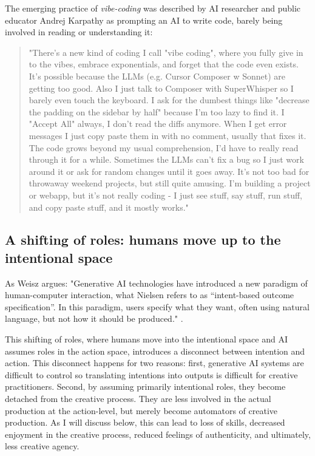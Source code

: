The emerging practice of \textit{vibe-coding} was described by AI researcher and public educator Andrej Karpathy as prompting an AI to write code, barely being involved in reading or understanding it:

\begin{quote}
"There's a new kind of coding I call "vibe coding", where you fully give in to the vibes, embrace exponentials, and forget that the code even exists. It's possible because the LLMs (e.g. Cursor Composer w Sonnet) are getting too good. Also I just talk to Composer with SuperWhisper so I barely even touch the keyboard. I ask for the dumbest things like "decrease the padding on the sidebar by half" because I'm too lazy to find it. I "Accept All" always, I don't read the diffs anymore. When I get error messages I just copy paste them in with no comment, usually that fixes it. The code grows beyond my usual comprehension, I'd have to really read through it for a while. Sometimes the LLMs can't fix a bug so I just work around it or ask for random changes until it goes away. It's not too bad for throwaway weekend projects, but still quite amusing. I'm building a project or webapp, but it's not really coding - I just see stuff, say stuff, run stuff, and copy paste stuff, and it mostly works."
\end{quote}

\subsection{A shifting of roles: humans move up to the intentional space}
As Weisz argues: "Generative AI technologies have introduced a new paradigm of human-computer interaction, what Nielsen refers to as “intent-based outcome specification”. In this paradigm, users specify what they want, often using natural language, but not how it should be produced." \cite{Weisz2024-io}.

This shifting of roles, where humans move into the intentional space and AI assumes roles in the action space, introduces a disconnect between intention and action. This disconnect happens for two reasons: first, generative AI systems are difficult to control so translating intentions into outputs is difficult for creative practitioners. Second, by assuming primarily intentional roles, they become detached from the creative process. They are less involved in the actual production at the action-level, but merely become automators of creative production. As I will discuss below, this can lead to loss of skills, decreased enjoyment in the creative process, reduced feelings of authenticity, and ultimately, less creative agency.

